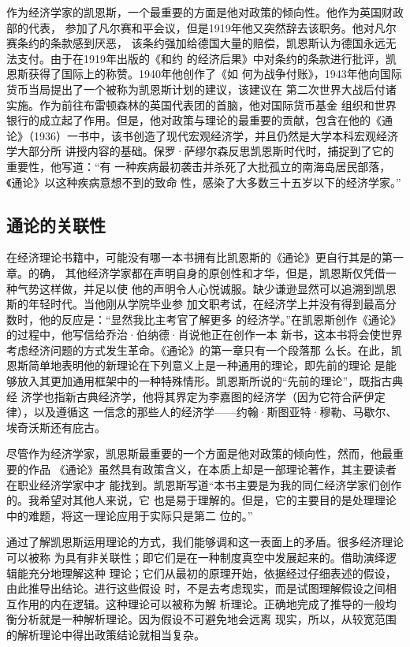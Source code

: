 作为经济学家的凯恩斯，一个最重要的方面是他对政策的倾向性。他作为英国财政部的代表，
参加了凡尔赛和平会议，但是1919年他又突然辞去该职务。他对凡尔赛条约的条款感到厌恶，
该条约强加给德国大量的赔偿，凯恩斯认为德国永远无法支付。由于在1919年出版的《和约
的经济后果》中对条约的条款进行批评，凯恩斯获得了国际上的称赞。1940年他创作了《如
何为战争付账》，1943年他向国际货币当局提出了一个被称为凯恩斯计划的建议，该建议在
第二次世界大战后付诸实施。作为前往布雷顿森林的英国代表团的首脑，他对国际货币基金
组织和世界银行的成立起了作用。但是，他对政策与理论的最重要的贡献，包含在他的《通
论》（1936）一书中，该书创造了现代宏观经济学，并且仍然是大学本科宏观经济学大部分所
讲授内容的基础。保罗·萨缪尔森反思凯恩斯时代时，捕捉到了它的重要性，他写道：“有
一种疾病最初袭击并杀死了大批孤立的南海岛居民部落，《通论》以这种疾病意想不到的致命
性，感染了大多数三十五岁以下的经济学家。”

\subsection{通论的关联性}

在经济理论书籍中，可能没有哪一本书拥有比凯恩斯的《通论》更自行其是的第一章。的确，
其他经济学家都在声明自身的原创性和才华，但是，凯恩斯仅凭借一种气势这样做，并足以使
他的声明令人心悦诚服。缺少谦逊显然可以追溯到凯恩斯的年轻时代。当他刚从学院毕业参
加文职考试，在经济学上并没有得到最高分数时，他的反应是：“显然我比主考官了解更多
的经济学。”在凯恩斯创作《通论》的过程中，他写信给乔治·伯纳德·肖说他正在创作一本
新书，这本书将会使世界考虑经济问题的方式发生革命。《通论》的第一章只有一个段落那
么长。在此，凯恩斯简单地表明他的新理论在下列意义上是一种通用的理论，即先前的理论
是能够放入其更加通用框架中的一种特殊情形。凯恩斯所说的“先前的理论”，既指古典经
济学也指新古典经济学，他将其界定为李嘉图的经济学（因为它符合萨伊定律），以及遵循这
一信念的那些人的经济学——约翰·斯图亚特·穆勒、马歇尔、埃奇沃斯还有庇古。

尽管作为经济学家，凯恩斯最重要的一个方面是他对政策的倾向性，然而，他最重要的作品
《通论》虽然具有政策含义，在本质上却是一部理论著作，其主要读者在职业经济学家中才
能找到。凯恩斯写道“本书主要是为我的同仁经济学家们创作的。我希望对其他人来说，它
也是易于理解的。但是，它的主要目的是处理理论中的难题，将这一理论应用于实际只是第二
位的。”

通过了解凯恩斯运用理论的方式，我们能够调和这一表面上的矛盾。很多经济理论可以被称
为具有非关联性；即它们是在一种制度真空中发展起来的。借助演绎逻辑能充分地理解这种
理论；它们从最初的原理开始，依据经过仔细表述的假设，由此推导出结论。进行这些假设
时，不是去考虑现实，而是试图理解假设之间相互作用的内在逻辑。这种理论可以被称为解
析理论。正确地完成了推导的一般均衡分析就是一种解析理论。因为假设不可避免地会远离
现实，所以，从较宽范围的解析理论中得出政策结论就相当复杂。

